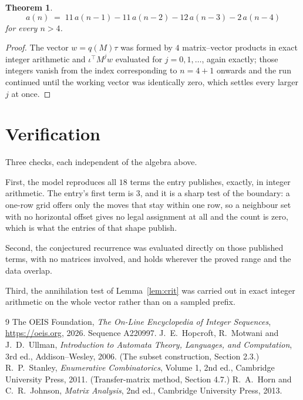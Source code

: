 \documentclass[11pt,a4paper]{article}
\theoremstyle{plain}
\newtheorem{theorem}{Theorem}
\theoremstyle{definition}
\begin{document}
\begin{theorem}
\[
a(n)\;=\;11\,a(n-1) - 11\,a(n-2) - 12\,a(n-3) - 2\,a(n-4)
\]
for every $n>4$.
\end{theorem}

\begin{proof}
The vector $w=q(M)\tau$ was formed by $4$ matrix--vector products in exact integer
arithmetic and $\iota^{\!\top}M^{j}w$ evaluated for $j=0,1,\dots$, again exactly; those
integers vanish from the index corresponding to $n=4+1$ onwards and the run continued
until the working vector was identically zero, which settles every larger $j$ at once.
\end{proof}

\section{Verification}

Three checks, each independent of the algebra above.

First, the model reproduces all $18$ terms the entry publishes, exactly, in integer
arithmetic. The entry's first term is $3$, and it is a sharp test of the boundary: a
one-row grid offers only the moves that stay within one row, so a neighbour set with no
horizontal offset gives no legal assignment at all and the count is zero, which is what the
entries of that shape publish.

Second, the conjectured recurrence was evaluated directly on those published terms, with no
matrices involved, and holds wherever the proved range and the data overlap.

Third, the annihilation test of Lemma~\ref{lem:crit} was carried out in exact integer
arithmetic on the whole vector rather than on a sampled prefix.

\begin{thebibliography}{9}
 The OEIS Foundation, \emph{The On-Line Encyclopedia of Integer
Sequences}, \url{https://oeis.org}, 2026. Sequence A220997.
 J.~E.~Hopcroft, R.~Motwani and J.~D.~Ullman, \emph{Introduction to Automata
Theory, Languages, and Computation}, 3rd ed., Addison--Wesley, 2006. (The subset
construction, Section 2.3.)
 R.~P.~Stanley, \emph{Enumerative Combinatorics}, Volume 1, 2nd ed.,
Cambridge University Press, 2011. (Transfer-matrix method, Section 4.7.)
 R.~A.~Horn and C.~R.~Johnson, \emph{Matrix Analysis}, 2nd ed., Cambridge
University Press, 2013.
\end{thebibliography}
\end{document}
